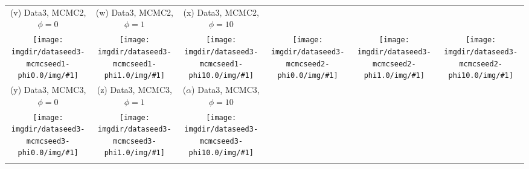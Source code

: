 {\begin{tabular}{cccccc}
    {\tiny (v) Data3, MCMC2, $\phi=0$} &
    {\tiny (w) Data3, MCMC2, $\phi=1$} &
    {\tiny (x) Data3, MCMC2, $\phi=10$} \\
    \texttt{[image: \\imgdir/dataseed3-mcmcseed1-phi0.0/img/\#1]} &
    \texttt{[image: \\imgdir/dataseed3-mcmcseed1-phi1.0/img/\#1]} &
    \texttt{[image: \\imgdir/dataseed3-mcmcseed1-phi10.0/img/\#1]} &
    \texttt{[image: \\imgdir/dataseed3-mcmcseed2-phi0.0/img/\#1]} &
    \texttt{[image: \\imgdir/dataseed3-mcmcseed2-phi1.0/img/\#1]} &
    \texttt{[image: \\imgdir/dataseed3-mcmcseed2-phi10.0/img/\#1]} \\
    {\tiny (y) Data3, MCMC3, $\phi=0$} &
    {\tiny (z) Data3, MCMC3, $\phi=1$} &
    {\tiny ($\alpha$) Data3, MCMC3, $\phi=10$} &
    & & \\
    \texttt{[image: \\imgdir/dataseed3-mcmcseed3-phi0.0/img/\#1]} &
    \texttt{[image: \\imgdir/dataseed3-mcmcseed3-phi1.0/img/\#1]} &
    \texttt{[image: \\imgdir/dataseed3-mcmcseed3-phi10.0/img/\#1]} \\
    & & \\
  \end{tabular}
}
